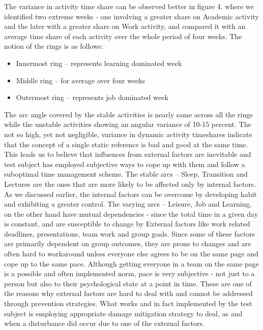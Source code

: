 \documentclass[conference]{IEEEtran}
\begin{document}
The variance in activity time share can be observed better in figure 4. where we identified two extreme weeks - one involving a greater share on Academic activity and the later with a greater share on Work activity, and compared it with an average time share of each activity over the whole period of four weeks. The notion of the rings is as follows:
\begin{itemize}
  \item Innermost ring -- represents learning dominated week
  \item Middle ring -- for average over four weeks
  \item Outermost ring -- represents job dominated week
\end{itemize}
The arc angle covered by the stable activities is nearly same across all the rings while the unstable activities showing an angular variance of 10-15 percent. The not so high, yet not negligible, variance in dynamic activity timeshares indicate that the concept of a single static reference is bad and good at the same time. This leads us to believe that influences from external factors are inevitable and test subject has employed subjective ways to cope up with them and follow a suboptimal time management scheme. The stable arcs -- Sleep, Transition and Lectures are the ones that are more likely to be affected only by internal factors. As we discussed earlier, the internal factors can be overcome by developing habit and exhibiting a greater control. The varying arcs -- Leisure, Job and Learning, on the other hand have mutual dependencies - since the total time in a given day is constant, and are susceptible to change by External factors like work related deadlines, presentations, team work and group goals. Since some of these factors are primarily dependent on group outcomes, they are prone to changes and are often hard to workaround unless everyone else agrees to be on the same page and cope up to the same pace. Although getting everyone in a team on the same page is a possible and often implemented norm, pace is very subjective - not just to a person but also to their psychological state at a point in time. These are one of the reasons why external factors are hard to deal with and cannot be addressed through prevention strategies. What works and in fact implemented by the test subject is employing appropriate damage mitigation strategy to deal, as and when a disturbance did occur due to one of the external factors. 
\end{document}

